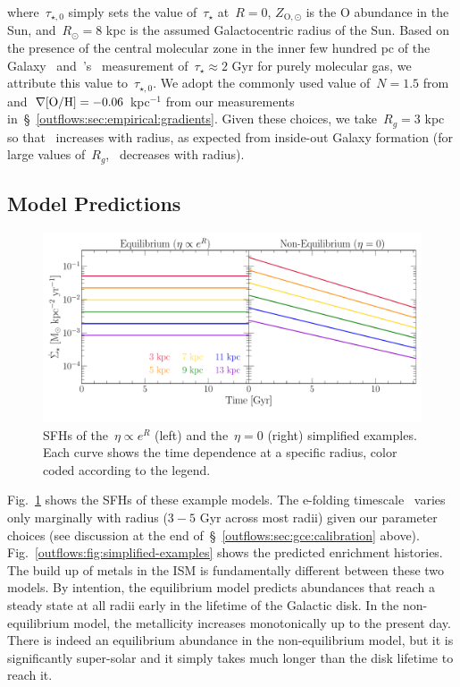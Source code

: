 where~$\tau_{\star,0}$ simply sets the value of~$\tau_\star$ at~$R = 0$,
$Z_{\text{O},\odot}$ is the O abundance in the Sun, and~$R_\odot = 8$ kpc is
the assumed Galactocentric radius of the Sun.
Based on the presence of the central molecular zone in the inner few hundred pc
of the Galaxy~\citep[e.g.,][]{Morris1996, Dahmen1998, PiercePrice2000,
Hatchfield2020} and~\citeauthor{Leroy2008}'s~\citeyearpar{Leroy2008}
measurement of~$\tau_\star \approx 2$ Gyr for purely molecular gas, we
attribute this value to~$\tau_{\star,0}$.
We adopt the commonly used value of~$N = 1.5$ from~\citet{Kennicutt1998}
and~$\nabla\text{[O/H]} = -0.06$ kpc$^{-1}$ from our measurements
in~\S~\ref{outflows:sec:empirical:gradients}.
Given these choices, we take~$R_g = 3$ kpc so that~ increases
with radius, as expected from inside-out Galaxy formation (for large values
of~$R_g$,~ decreases with radius).

\subsection{Model Predictions}
\label{outflows:sec:gce:predictions}

\begin{figure}
\centering
\includegraphics[scale = 0.5]{simplified-examples-sfhs.pdf}
\caption{
SFHs of the~$\eta \propto e^R$ (left) and the~$\eta = 0$ (right) simplified
examples.
Each curve shows the time dependence at a specific radius, color coded
according to the legend.
}
\label{outflows:fig:simplified-examples-sfhs}
\end{figure}

Fig.~\ref{outflows:fig:simplified-examples-sfhs} shows the SFHs of these
example models.
The e-folding timescale~ varies only marginally with radius
($3 - 5$ Gyr across most radii) given our parameter choices (see discussion
at the end of~\S~\ref{outflows:sec:gce:calibration} above).
Fig.~\ref{outflows:fig:simplified-examples} shows the predicted enrichment
histories.
The build up of metals in the ISM is fundamentally different between these two
models.
By intention, the equilibrium model predicts abundances that reach a steady
state at all radii early in the lifetime of the Galactic disk.
In the non-equilibrium model, the metallicity increases monotonically up to the
present day.
There is indeed an equilibrium abundance in the non-equilibrium model, but it
is significantly super-solar and it simply takes much longer than the disk
lifetime to reach it.

